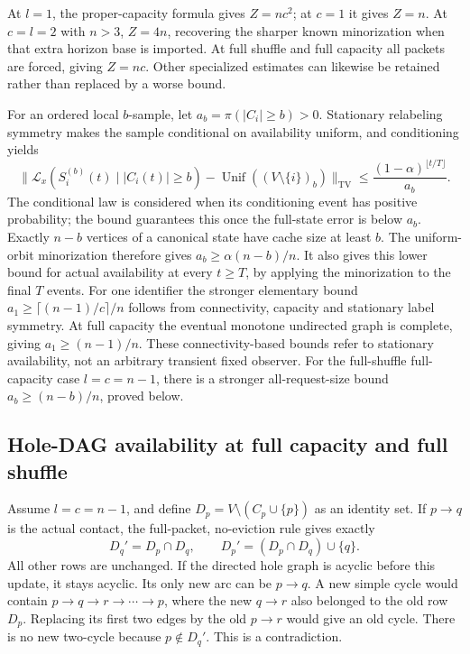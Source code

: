 \documentclass[11pt]{article}
\newcommand{\TV}{\mathrm{TV}}
\begin{document}
At $l=1$, the proper-capacity formula gives $Z=nc^2$; at $c=1$ it gives
$Z=n$. At $c=l=2$ with $n>3$, $Z=4n$, recovering the sharper known
minorization when that extra horizon base is imported. At full shuffle
and full capacity all packets are forced, giving $Z=nc$. Other specialized
estimates can likewise be retained rather than replaced by a worse bound.

For an ordered local $b$-sample, let $a_b=\pi(|C_i|\ge b)>0$.
Stationary relabeling symmetry makes the sample conditional on availability
uniform, and conditioning yields
\[
 \|\mathcal L_x(S_i^{(b)}(t)\mid |C_i(t)|\ge b)
       -\operatorname{Unif}((V\setminus\{i\})_b)\|_{\TV}
 \le \frac{(1-\alpha)^{\lfloor t/T\rfloor}}{a_b}.
\]
The conditional law is considered when its conditioning event has positive
probability; the bound guarantees this once the full-state error is below
$a_b$. Exactly $n-b$ vertices of a canonical state have cache size at least $b$.
The uniform-orbit minorization therefore gives $a_b\ge\alpha(n-b)/n$.
It also gives this lower bound for actual availability at every $t\ge T$,
by applying the minorization to the final $T$ events.
For one identifier the stronger elementary bound
$a_1\ge\lceil(n-1)/c\rceil/n$ follows from connectivity, capacity and
stationary label symmetry. At full capacity the eventual monotone undirected
graph is complete, giving $a_1\ge(n-1)/n$. These connectivity-based bounds
refer to stationary availability, not an arbitrary transient fixed observer.
For the full-shuffle full-capacity case $l=c=n-1$, there is a stronger
all-request-size bound $a_b\ge(n-b)/n$, proved below.

\subsection*{Hole-DAG availability at full capacity and full shuffle}
Assume $l=c=n-1$, and define $D_p=V\setminus(C_p\cup\{p\})$ as an
identity set. If $p\to q$ is the actual contact, the full-packet, no-eviction
rule gives exactly
\[
 D_q'=D_p\cap D_q,\qquad D_p'=(D_p\cap D_q)\cup\{q\}.
\]
All other rows are unchanged. If the directed hole graph is acyclic before
this update, it stays acyclic. Its only new arc can be $p\to q$.
A new simple cycle would contain $p\to q\to r\to\cdots\to p$,
where the new $q\to r$ also belonged to the old row $D_p$.
Replacing its first two edges by the old $p\to r$ would give an old cycle.
There is no new two-cycle because $p\notin D_q'$. This is a contradiction.
\end{document}
